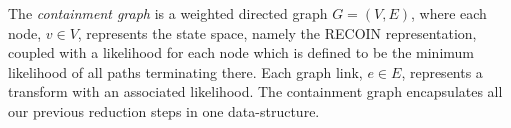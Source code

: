 


\begin{definition}
The \emph{containment graph} is a weighted directed graph $G=(V,E)$, where each node, $v \in V$, represents the state space, namely the RECOIN representation, coupled with a likelihood for each node which is defined to be the minimum likelihood of all paths terminating there. Each graph link, $e \in E$, represents a transform with an associated likelihood. The containment graph encapsulates all our previous reduction steps in one data-structure.


\label{def:cgraph}
\end{definition}

